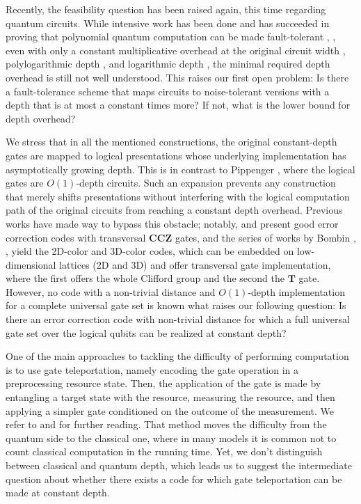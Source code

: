 \documentclass[manuscript,screen,review]{acmart}
\begin{document}
{Recently, the feasibility question has been raised again, this time regarding quantum circuits. While intensive work has been done and has succeeded in proving that polynomial quantum computation can be made fault-tolerant \cite{aharonov1999faulttolerant}, \cite{gottesman2014faulttolerant}, even with only a constant multiplicative overhead at the original circuit width \cite{grospellier:tel-03364419}, polylogarithmic depth \cite{tamiya2024polylogtimeconstantspaceoverheadfaulttolerantquantum}, and logarithmic depth \cite{Nguyen2024QuantumFT}, the minimal required depth overhead is still not well understood. This raises our first open problem: Is there a fault-tolerance scheme that maps circuits to noise-tolerant versions with a depth that is at most a constant times more? If not, what is the lower bound for depth overhead?

We stress that in all the mentioned constructions, the original constant-depth gates are mapped to logical presentations whose underlying implementation has asymptotically growing depth. This is in contrast to Pippenger \cite{Pippenger}, where the logical gates are $O(1)$-depth circuits.
Such an expansion prevents any construction that merely shifts presentations without interfering with the logical computation path of the original circuits from reaching a constant depth overhead. Previous works have made way to bypass this obstacle; notably, \cite{nguyen2024goodbinaryquantumcodes} and \cite{li2025poincaredualitymultiplicativestructures} present good error correction codes with transversal $\mathbf{CCZ}$ gates, and the series of works by Bombin \cite{PhysRevLett.97.180501}, \cite{PhysRevA.81.032301}, \cite{Bombín_2015} yield the 2D-color and 3D-color codes, which can be embedded on low-dimensional lattices (2D and 3D) and offer transversal gate implementation, where the first offers the whole Clifford group and the second the $\mathbf{T}$ gate. However, no code with a non-trivial distance and $O(1)$-depth implementation for a complete universal gate set is known what raises our following question: Is there an error correction code with non-trivial distance for which a full universal gate set over the logical qubits can be realized at constant depth? 


One of the main approaches to tackling the difficulty of performing computation is to use gate teleportation, namely encoding the gate operation in a preprocessing resource state. Then, the application of the gate is made by entangling a target state with the resource, measuring the resource, and then applying a simpler gate conditioned on the outcome of the measurement. We refer to \cite{gottesman2014faulttolerant} and \cite{grospellier:tel-03364419} for further reading. That method moves the difficulty from the quantum side to the classical one, where in many models it is common not to count classical computation in the running time. Yet, we don't distinguish between classical and quantum depth, which leads us to suggest the intermediate question about whether there exists a code for which gate teleportation can be made at constant depth.


}
\end{document}
